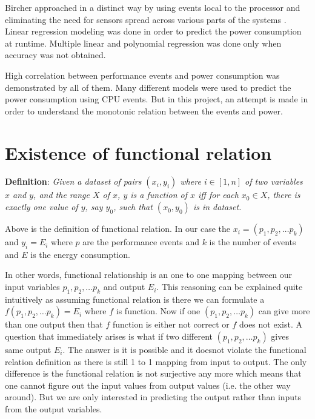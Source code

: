 Bircher approached in a distinct way by using events local to the processor and eliminating the need for sensors spread across various parts of the systems \cite{bircher2012complete}. Linear regression modeling was done in order to predict the power consumption at runtime. Multiple linear and polynomial regression was done only when accuracy was not obtained. 

High correlation between performance events and power consumption was demonstrated by all of them. Many different models were used to predict the power consumption using CPU events. But in this project, an attempt is made in order to understand the monotonic relation between the events and power.


\section{Existence of functional relation}

\textbf{Definition}: \textit{Given a dataset of pairs \((x_i, y_i)\) where \(i \in [1, n]\) of two variables \(x\) and \(y\), and the range \(X\) of \(x\), \(y\) is a function of \(x\) iff for each \(x_0 \in X\), there is exactly one value of \(y\), say \(y_0\), such that \((x_0, y_0)\) is in dataset.}~\cite{zembowicz1993testing}

Above is the definition of functional relation. In our case the \(x_i = (p_1, p_2, \ldots p_k)\) and \(y_i = E_i\) where \(p\) are the performance events and \(k\) is the number of events and \(E\) is the energy consumption.

In other words, functional relationship is an one to one mapping between our input variables \(p_1, p_2, \ldots p_k\) and output \(E_i\). This reasoning can be explained quite intuitively as assuming functional relation is there we can formulate a \(f(p_1, p_2, \ldots p_k) = E_i\) where \(f\) is function. Now if one \((p_1, p_2, \ldots p_k)\) can give more than one output then that \(f\) function is either not correct or \(f\) does not exist. A question that immediately arises is what if two different \((p_1, p_2, \ldots p_k)\) gives same output \(E_i\). The answer is it is possible and it doesnot violate the functional relation definition as there is still 1 to 1 mapping from input to output. The only difference is the functional relation is not surjective any more which means that one cannot figure out the input values from output values (i.e. the other way around). But we are only interested in predicting the output rather than inputs from the output variables.

